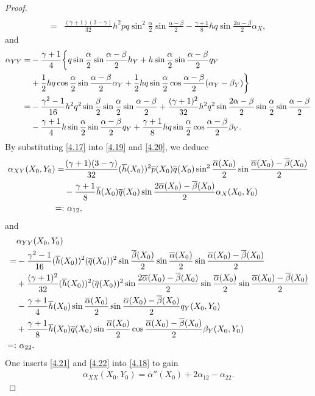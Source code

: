 \documentclass[11pt,reqno]{article}
\newcommand{\fr}{\frac}
\numberwithin{equation}{section}
\begin{document}
\begin{proof}
\begin{align}
\\
=&\fr{(\gamma+1)(3-\gamma)}{32}h^2pq\sin^2\fr{\alpha}{2}\sin\fr{\alpha-\beta}{2} -\fr{\gamma+1}{8}hq\sin\fr{2\alpha-\beta}{2}\alpha_X,
\end{align}
and
\begin{align}\label{4.20}
\alpha_{YY}=&-\fr{\gamma+1}{4}\bigg\{q\sin\fr{\alpha}{2}\sin\fr{\alpha-\beta}{2}h_Y +h\sin\fr{\alpha}{2}\sin\fr{\alpha-\beta}{2}q_Y \notag \\ &+\fr{1}{2}hq\cos\fr{\alpha}{2}\sin\fr{\alpha-\beta}{2}\alpha_Y +\fr{1}{2}hq\sin\fr{\alpha}{2}\cos\fr{\alpha-\beta}{2}(\alpha_Y-\beta_Y)\bigg\} \notag
\\
=& -\fr{\gamma^2-1}{16}h^2q^2\sin\fr{\beta}{2}\sin\fr{\alpha}{2}\sin\fr{\alpha-\beta}{2} + \fr{(\gamma+1)^2}{32} h^2q^2\sin\fr{2\alpha-\beta}{2}\sin\fr{\alpha}{2}\sin\fr{\alpha-\beta}{2}   \notag \\
&-\fr{\gamma+1}{4}h\sin\fr{\alpha}{2}\sin\fr{\alpha-\beta}{2}q_Y +\fr{\gamma+1}{8}hq\sin\fr{\alpha}{2}\cos\fr{\alpha-\beta}{2}\beta_Y.
\end{align}
By substituting \eqref{4.17} into \eqref{4.19} and \eqref{4.20}, we deduce
\begin{align}\label{4.21}
\alpha_{XY}(X_0,Y_0)=&\fr{(\gamma+1)(3-\gamma)}{32}(\overline{h}(X_0))^2\overline{p}(X_0) \overline{q}(X_0)\sin^2\fr{\overline{\alpha}(X_0)}{2}\sin\fr{\overline{\alpha}(X_0) -\overline{\beta}(X_0)}{2} \notag \\ &-\fr{\gamma+1}{8}\overline{h}(X_0)\overline{q}(X_0) \sin\fr{2\overline{\alpha}(X_0)-\overline{\beta}(X_0)}{2}\alpha_X(X_0,Y_0) \notag \\
=:&\ \alpha_{12},
\end{align}
and
\begin{align}\label{4.22}
&\alpha_{YY}(X_0,Y_0) \notag \\
=& -\fr{\gamma^2-1}{16}(\overline{h}(X_0))^2(\overline{q}(X_0))^2  \sin\fr{\overline{\beta}(X_0)}{2} \sin\fr{\overline{\alpha}(X_0)}{2}\sin\fr{\overline{\alpha}(X_0)-\overline{\beta}(X_0)}{2} \notag \\
&+\fr{(\gamma+1)^2}{32}(\overline{h}(X_0))^2(\overline{q}(X_0))^2 \sin\fr{2\overline{\alpha}(X_0)-\overline{\beta}(X_0)}{2} \sin\fr{\overline{\alpha}(X_0)}{2}\sin\fr{\overline{\alpha}(X_0)-\overline{\beta}(X_0)}{2}
\notag \\
&-\fr{\gamma+1}{4}\overline{h}(X_0) \sin\fr{\overline{\alpha}(X_0)}{2}\sin\fr{\overline{\alpha}(X_0) -\overline{\beta}(X_0)}{2}q_Y(X_0,Y_0) \notag \\ &+\fr{\gamma+1}{8}\overline{h}(X_0)\overline{q}(X_0) \sin\fr{\overline{\alpha}(X_0)}{2}\cos\fr{\overline{\alpha}(X_0) -\overline{\beta}(X_0)}{2}\beta_Y(X_0,Y_0) \notag \\
=:&\ \alpha_{22}.
\end{align}
One inserts \eqref{4.21} and \eqref{4.22} into \eqref{4.18} to gain
\begin{align}\label{4.23}
\alpha_{XX}(X_0,Y_0)=\overline{\alpha}''(X_0)+2\alpha_{12}-\alpha_{22}.
\end{align}


\end{proof}
\end{document}
